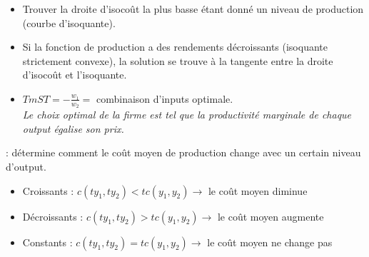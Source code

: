 \begin{itemize}
\item Trouver la droite d'isocoût la plus basse étant donné un niveau de production (courbe d'isoquante).
\item Si la fonction de production a des rendements décroissants (isoquante strictement convexe), la solution se trouve à la tangente entre la droite d'isocoût et l'isoquante.
\item $TmST = -\frac{w_1}{w_2} =$ combinaison d'inputs optimale.\\
\textit{Le choix optimal de la firme est tel que la productivité marginale de chaque output égalise son prix.}
\end{itemize}

 : détermine comment le coût moyen de production change avec un certain niveau d'output.
\begin{itemize}
\item Croissants : $c(ty_1, ty_2) < tc(y_1, y_2) \rightarrow$ le coût moyen diminue
\item Décroissants : $c(ty_1, ty_2) > tc(y_1, y_2) \rightarrow$ le coût moyen augmente
\item Constants : $c(ty_1, ty_2) = tc(y_1, y_2) \rightarrow$ le coût moyen ne change pas
\end{itemize}
